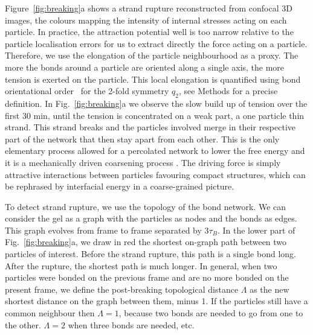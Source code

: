\documentclass[footinbib,amsmath,amssymb,superscriptaddress,twocolumn]{revtex4}
\begin{document}
Figure~\ref{fig:breaking}a shows a strand rupture reconstructed from confocal 3D images, the colours mapping the intensity of internal stresses acting on each particle. In practice, the attraction potential well is too narrow relative to the particle localisation errors for us to extract directly the force acting on a particle. Therefore, we use the elongation of the particle neighbourhood as a proxy. The more the bonds around a particle are oriented along a single axis, the more tension is exerted on the particle. This local elongation is quantified using bond orientational order~\cite{steinhardt1983boo} for the 2-fold symmetry $q_2$, see Methods for a precise definition. In Fig.~\ref{fig:breaking}a we observe the slow build up of tension over the first 30 min, until the tension is concentrated on a weak part, a one particle thin strand. This strand breaks and the particles involved merge in their respective part of the network that then stay apart from each other. This is the only elementary process allowed for a percolated network to lower the free energy and it is a mechanically driven coarsening process \cite{Tanaka2007}. The driving force is simply attractive interactions between particles favouring compact structures, which can be rephrased by 
interfacial energy in a coarse-grained picture. 

To detect strand rupture, we use the topology of the bond network. We can consider the gel as a graph with the particles as nodes and the bonds as edges. This graph evolves from frame to frame separated by $3\tau_B$. In the lower part of Fig.~\ref{fig:breaking}a, we draw in red the shortest on-graph path between two particles of interest. Before the strand rupture, this path is a single bond long. After the rupture, the shortest path is much longer. In general, when two particles were bonded on the previous frame and are no more bonded on the present frame, we define the post-breaking topological distance $\Lambda$ as the new shortest distance on the graph between them, minus 1. If the particles still have a common neighbour then $\Lambda=1$, because two bonds are needed to go from one to the other. $\Lambda=2$ when three bonds are needed, etc.
\end{document}
